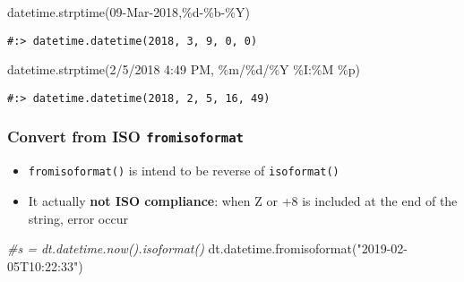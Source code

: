 \documentclass[
]{book}
\newenvironment{Shaded}{\begin{snugshade}}{\end{snugshade}}
\newcommand{\CommentTok}[1]{\textcolor[rgb]{0.37,0.37,0.37}{\textit{#1}}}
\newcommand{\NormalTok}[1]{#1}
\newcommand{\SpecialCharTok}[1]{\textcolor[rgb]{0,0,0}{#1}}
\newcommand{\StringTok}[1]{\textcolor[rgb]{0.5,0.5,0.5}{#1}}
\providecommand{\tightlist}{%
  \setlength{\itemsep}{0pt}\setlength{\parskip}{0pt}}
\begin{document}
\begin{Shaded}
\begin{Highlighting}[]
\NormalTok{datetime.strptime(}\StringTok{\textquotesingle{}09{-}Mar{-}2018\textquotesingle{}}\NormalTok{,}\StringTok{\textquotesingle{}}\SpecialCharTok{\%d}\StringTok{{-}\%b{-}\%Y\textquotesingle{}}\NormalTok{)}
\end{Highlighting}
\end{Shaded}

\begin{verbatim}
#:> datetime.datetime(2018, 3, 9, 0, 0)
\end{verbatim}

\begin{Shaded}
\begin{Highlighting}[]
\NormalTok{datetime.strptime(}\StringTok{\textquotesingle{}2/5/2018 4:49 PM\textquotesingle{}}\NormalTok{, }\StringTok{\textquotesingle{}\%m/}\SpecialCharTok{\%d}\StringTok{/\%Y \%I:\%M \%p\textquotesingle{}}\NormalTok{)}
\end{Highlighting}
\end{Shaded}

\begin{verbatim}
#:> datetime.datetime(2018, 2, 5, 16, 49)
\end{verbatim}

\hypertarget{convert-from-iso-fromisoformat-1}{%
\subsubsection{\texorpdfstring{Convert from ISO \texttt{fromisoformat}}{Convert from ISO fromisoformat}}\label{convert-from-iso-fromisoformat-1}}

\begin{itemize}
\tightlist
\item
  \texttt{fromisoformat()} is intend to be reverse of \texttt{isoformat()}\\
\item
  It actually \textbf{not ISO compliance}: when Z or +8 is included at the end of the string, error occur
\end{itemize}

\begin{Shaded}
\begin{Highlighting}[]
\CommentTok{\#s = dt.datetime.now().isoformat()}
\NormalTok{dt.datetime.fromisoformat(}\StringTok{"2019{-}02{-}05T10:22:33"}\NormalTok{)}
\end{Highlighting}
\end{Shaded}
\end{document}
